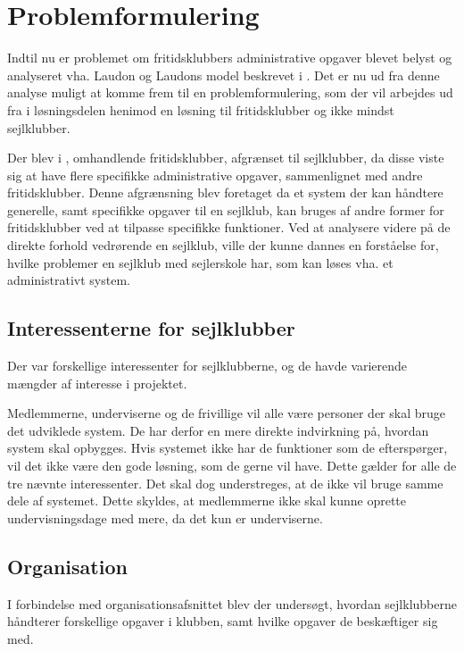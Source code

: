\chapter{Problemformulering}\label{chap:problemformulering-new}

Indtil nu er problemet om fritidsklubbers administrative opgaver blevet belyst og analyseret vha. Laudon og
Laudons model beskrevet i . 
Det er nu ud fra denne analyse muligt at komme frem til en problemformulering, som der vil arbejdes ud fra i løsningsdelen henimod en løsning til fritidsklubber og ikke mindst sejlklubber.

Der blev i , omhandlende fritidsklubber, afgrænset til sejlklubber, da disse viste sig at have flere specifikke administrative opgaver, sammenlignet med andre fritidsklubber. 
Denne afgrænsning blev foretaget da et system der kan håndtere generelle, samt specifikke opgaver til en sejlklub, kan bruges af andre former for fritidsklubber ved at tilpasse specifikke funktioner.
Ved at analysere videre på de direkte forhold vedrørende en sejlklub, ville der kunne dannes en forståelse for, hvilke problemer en sejlklub med sejlerskole har, som kan løses vha. et administrativt system.


\section{Interessenterne for sejlklubber}

Der var forskellige interessenter for sejlklubberne, og de havde varierende mængder af interesse i projektet.

Medlemmerne, underviserne og de frivillige vil alle være personer der skal bruge det udviklede system. De har
derfor en mere direkte indvirkning på, hvordan system skal opbygges. 
Hvis systemet ikke har de funktioner som de efterspørger, vil det ikke være den gode løsning, som de gerne vil have. 
Dette gælder for alle de tre nævnte interessenter. 
Det skal dog understreges, at de ikke vil bruge samme dele af systemet. 
Dette skyldes, at medlemmerne ikke skal kunne oprette undervisningsdage med mere, da det kun er underviserne. 

\section{Organisation}

I forbindelse med organisationsafsnittet blev der undersøgt, hvordan sejlklubberne håndterer forskellige
opgaver i klubben, samt hvilke opgaver de beskæftiger sig med.

